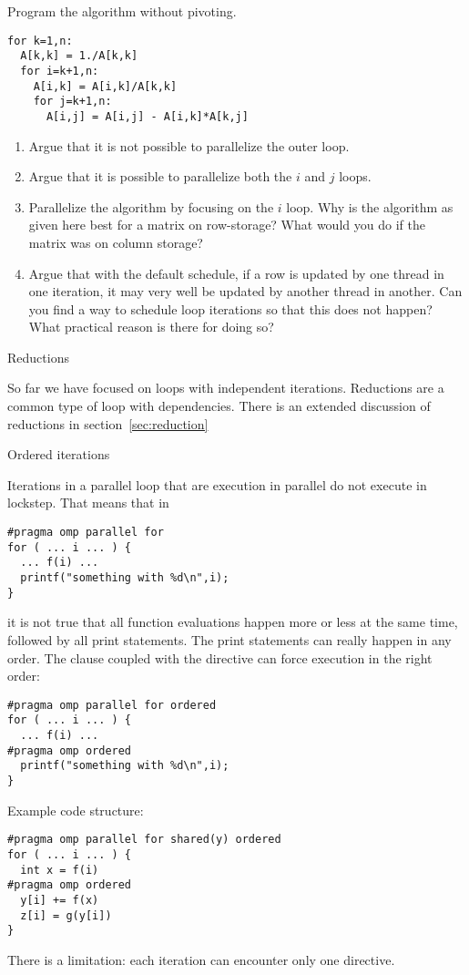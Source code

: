 \begin{exercise}
  Program the  algorithm without pivoting.
\begin{verbatim}
for k=1,n:
  A[k,k] = 1./A[k,k]
  for i=k+1,n:
    A[i,k] = A[i,k]/A[k,k]
    for j=k+1,n:
      A[i,j] = A[i,j] - A[i,k]*A[k,j]
\end{verbatim}
\begin{enumerate}
\item Argue that it is not possible to parallelize the outer loop.
\item Argue that it is possible to parallelize both the $i$ and $j$ loops.
\item Parallelize the algorithm by focusing on the $i$ loop. Why is the algorithm as given here best
  for a matrix on row-storage? What would you do if the matrix was on column storage?
\item Argue that with the default schedule, if a row is updated by one thread in one iteration,
  it may very well be updated by another thread in another. Can you find a way to schedule
  loop iterations so that this does not happen? What practical reason is there for doing so?
\end{enumerate}
\end{exercise}

 {Reductions}

So far we have focused on loops with independent iterations.
Reductions are a common type of loop with dependencies.
There is an extended discussion of reductions in section~\ref{sec:reduction}

 {Ordered iterations}

Iterations in a parallel loop that are execution in parallel do not
execute in lockstep. That means that in
\begin{verbatim}
#pragma omp parallel for
for ( ... i ... ) {
  ... f(i) ...
  printf("something with %d\n",i);
}
\end{verbatim}
it is not true that all function evaluations happen more or less at
the same time, followed by all print statements. The print statements
can really happen in any order. The  clause
coupled with the  directive can
force execution in the right order:
\begin{verbatim}
#pragma omp parallel for ordered
for ( ... i ... ) {
  ... f(i) ...
#pragma omp ordered
  printf("something with %d\n",i);
}
\end{verbatim}
Example code structure:
\begin{verbatim}
#pragma omp parallel for shared(y) ordered
for ( ... i ... ) {
  int x = f(i)
#pragma omp ordered
  y[i] += f(x)
  z[i] = g(y[i])
}
\end{verbatim}
There is a limitation:
each iteration can encounter only one  directive.

